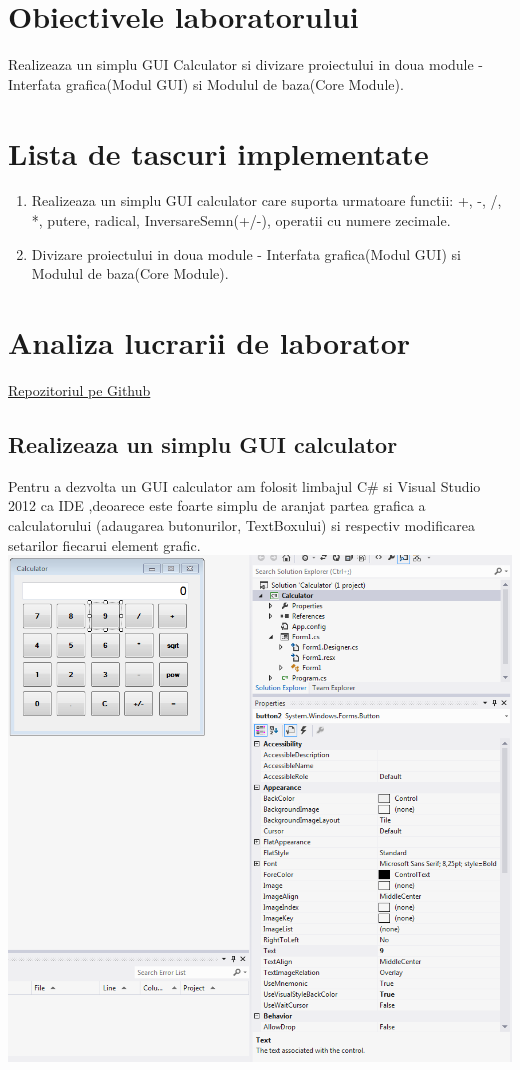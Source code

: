 \documentclass[a4paper, 12pt]{article}
\begin{document}
\section{Obiectivele laboratorului}
Realizeaza un simplu GUI Calculator si divizare proiectului in doua module - Interfata grafica(Modul GUI) si Modulul de baza(Core Module).

\section{Lista de tascuri implementate}
	\begin{enumerate}
	\item Realizeaza un simplu GUI calculator care suporta urmatoare functii: +, -, /, *, putere, radical, InversareSemn(+/-), operatii cu numere zecimale.
	\item Divizare proiectului in doua module - Interfata grafica(Modul GUI) si Modulul de baza(Core Module).
	\end{enumerate}

\section{Analiza lucrarii de laborator}
\href{https://github.com/VladislavCrivenco/MIDPS}{Repozitoriul pe Github}

\subsection{Realizeaza un simplu GUI calculator}

Pentru a dezvolta un GUI calculator am folosit limbajul C# si Visual Studio 2012 ca IDE ,deoarece este foarte simplu de aranjat partea grafica a calculatorului (adaugarea butonurilor, TextBoxului) si respectiv modificarea setarilor fiecarui element grafic.
\includegraphics*{GUI}
\end{document}
